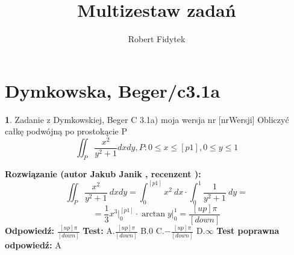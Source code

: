 \documentclass[12pt, a4paper]{article}
\title{Multizestaw zadań}
\author{Robert Fidytek}
\date{}
\theoremstyle{definition} %
\newtheorem{zad}{}
\newcommand{\kategoria}[1]{\section{#1}} %
\newcommand{\zadStart}[1]{\begin{zad}#1\newline} %
\newcommand{\zadStop}{\end{zad}}   %
\newcommand{\rozwStart}[2]{\noindent \textbf{Rozwiązanie (autor #1 , recenzent #2): }\newline} %
\newcommand{\rozwStop}{\newline}                                            %
\newcommand{\odpStart}{\noindent \textbf{Odpowiedź:}\newline}    %
\newcommand{\odpStop}{\newline}                                             %
\newcommand{\testStart}{\noindent \textbf{Test:}\newline} %
\newcommand{\testStop}{\newline} %
\newcommand{\kluczStart}{\noindent \textbf{Test poprawna odpowiedź:}\newline} %
\newcommand{\kluczStop}{\newline} %
\begin{document}
\maketitle


\kategoria{Dymkowska, Beger/c3.1a}
\zadStart{Zadanie z Dymkowskiej, Beger C 3.1a) moja wersja nr [nrWersji]}
Obliczyć całkę podwójną po prostokącie P $$\iint_P \frac{x^2}{y^2+1}dxdy, P: 0\leq x \leq [p1], 0 \leq y \leq 1$$
\zadStop
\rozwStart{Jakub Janik}{}
$$\iint_P \frac{x^2}{y^2+1}\ dxdy=\int_0^{[p1]}x^2\ dx \cdot \int_0^1 \frac{1}{y^2 + 1}\ dy=$$
$$=\frac{1}{3}x^{3}\Big|_0^{[p1]}\cdot \arctan{y}\Big|_0^1=\frac{[up]\pi}{[down]}$$
\rozwStop
\odpStart
$\frac{[up]\pi}{[down]}$
\odpStop
\testStart
A.$\frac{[up]\pi}{[down]}$
B.$0$
C.$-\frac{[up]\pi}{[down]}$
D.$\infty$
\testStop
\kluczStart
A
\kluczStop
\end{document}

